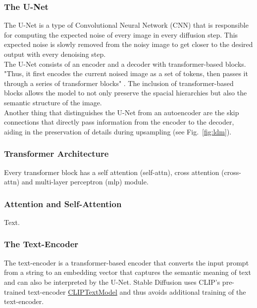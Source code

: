 \subsubsection{The U-Net}
The U-Net \cite{ronneberger2015u} is a type of Convolutional Neural Network (CNN) that is responsible for computing the expected noise of every image in every diffusion step. This expected noise is slowly removed from the noisy image to get closer to the desired output with every denoising step.\\
The U-Net consists of an encoder and a decoder with transformer-based blocks. "Thus, it first encodes the current noised image as a set of tokens, then passes it through a series of transformer blocks" \cite{bolya2023tomesd}. The inclusion of transformer-based blocks allows the model to not only preserve the spacial hierarchies but also the semantic structure of the image.\\
Another thing that distinguishes the U-Net from an autoencoder are the skip connections that directly pass information from the encoder to the decoder, aiding in the preservation of details during upsampling (see Fig.~\ref{fig:ldm}).



\subsubsection{Transformer Architecture}
Every transformer block has a self attention (self-attn), cross attention (cross-attn) and multi-layer perceptron (mlp) module.



\subsubsection{Attention and Self-Attention}
Text.



\subsubsection{The Text-Encoder}
The text-encoder is a transformer-based encoder that converts the input prompt from a string to an embedding vector that captures the semantic meaning of text and can also be interpreted by the U-Net. Stable Diffusion uses CLIP's \cite{radford2021learning} pre-trained text-encoder \href{https://huggingface.co/docs/transformers/model_doc/clip#transformers.CLIPTextModel}{CLIPTextModel} and thus avoids additional training of the text-encoder.




